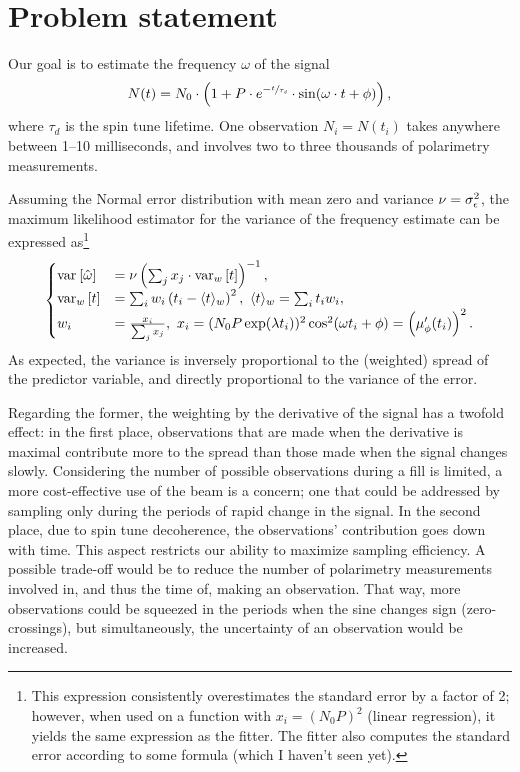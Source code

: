 \documentclass{article}
\begin{document}
	
\section*{Problem statement}

Our goal is to estimate the frequency $\omega$ of the signal
\begin{equation}
	N(t) = N_0\cdot\bkt{1 + P\cdot e^{-\sfrac{t}{\tau_d}}\cdot\sin(\omega\cdot t + \phi)},
\end{equation}
where $\tau_d$ is the spin tune lifetime. One observation $N_i = N(t_i)$ takes anywhere between 1--10 milliseconds, and involves two to three thousands of polarimetry measurements.

Assuming the Normal error distribution with mean zero and variance $\nu = \SD{\obs}^2$, the maximum likelihood estimator for the variance of the frequency estimate can be expressed as\footnote{This expression consistently overestimates the standard error by a factor of 2; however, when used on a function with $x_i = (N_0P)^2$ (linear regression), it yields the same expression as the fitter. The fitter also computes the standard error according to some formula (which I haven't seen yet).}
\begin{equation}
\begin{cases}
\var{\hat\omega} &= \nu\bkt{\sum_j x_j\cdot \var[w]{t}}^{-1}, \\
\var[w]{t} &= \sum_i w_i \bkt{t_i - \avg{t}_w}^2,~ \avg{t}_w = \sum_i t_i w_i, \\
w_i &= \frac{x_i}{\sum_j x_j},~ x_i = (N_0P\exp(\lambda t_i))^2\cos^2(\omega t_i + \phi) = \bkt{\mupp}^2.
\end{cases}	
\end{equation}
As expected, the variance is inversely proportional to the (weighted) spread of the predictor variable,
and directly proportional to the variance of the error. 

Regarding the former, the weighting by the derivative of the signal has a twofold effect: in the first place, observations that are made when the derivative is maximal contribute more to the spread than those made when the signal changes slowly. Considering the number of possible observations during a fill is limited, a more cost-effective use of the beam is a concern; one that could be addressed by sampling only during the periods of rapid change in the signal. In the second place, due to spin tune decoherence, the observations' contribution goes down with time. This aspect restricts our ability to maximize sampling efficiency. A possible trade-off would be to reduce the number of polarimetry measurements involved in, and thus the time of, making an observation. That way, more observations could be squeezed in the periods when the sine changes sign (zero-crossings), but simultaneously, the uncertainty of an observation would be increased. 
\end{document}
